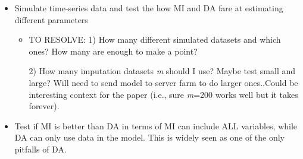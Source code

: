 \begin{itemize}
\item Simulate time-series data and test the how MI and DA fare at estimating different parameters
\begin{itemize}

\item TO RESOLVE: 1) How many different simulated datasets and which ones? How many are enough to make a point? %

2) How many imputation datasets \textit{m} should I use? Maybe test small and large? Will need to send model to server farm to do larger ones..Could be interesting context for the paper (i.e., sure \textit{m}=200 works well but it takes forever).  %
\end{itemize}
\item Test if MI is better than DA in terms of MI can include ALL variables, while DA can only use data in the model. This is widely seen as one of the only pitfalls of DA. %
\end{itemize}




